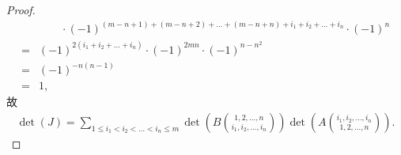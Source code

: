\documentclass[%
    UTF8,%
    fontset=none,%
    punct=kaiming,%
    zihao=-4,%
    a4paper,%
    oneside,%
]{ctexbook}
\renewcommand*{\leq}{\leqslant}
\begin{document}
\begin{proof}
\begin{align*}
             & \qquad
        \cdot
        (-1)^{(m-n+1) + (m-n+2) + \dots + (m-n+n)
            + i_1 + i_2 + \dots + i_n}
        \cdot
        (-1)^n
        \\
        = {} & (-1)^{2(i_1+i_2+\dots+i_n)}
        \cdot (-1)^{2mn} \cdot (-1)^{n-n^2}
        \\
        = {} & (-1)^{-n(n-1)}
        \\
        = {} & 1,
    \end{align*}
    故
    \begin{align*}
        \det {(J)}
        = \sum_{1 \leq i_1 < i_2 < \dots < i_n \leq m}
        {\det {\left(
                B
                \binom{1,2,\dots,n}{i_1,i_2,\dots,i_n}
                \right)}
            \det {\left(
                A\binom{i_1,i_2,\dots,i_n}{1,2,\dots,n}
                \right)}}.
    \end{align*}


\end{proof}
\end{document}
